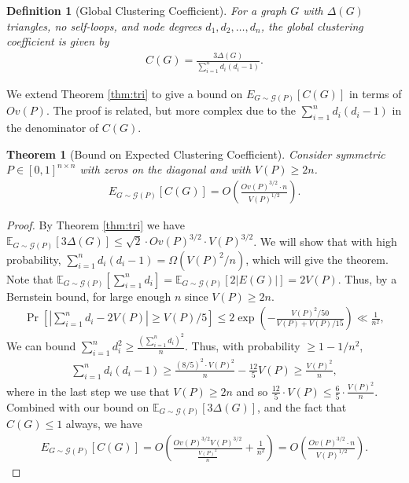 \documentclass{article}
\newtheorem{theorem}{Theorem}
\newtheorem{definition}{Definition}
\newcommand{\E}{\mathbb{E}}
\begin{document}
\begin{definition}[Global Clustering Coefficient]\label{def:cc}
For a graph $G$ with $\Delta(G)$ triangles, no self-loops, and node degrees $d_1,d_2,\ldots, d_n$, the global clustering coefficient is given by
\begin{align*}
C(G) = \frac{3 \Delta(G)}{\sum_{i=1}^n d_i(d_i-1)}.
\end{align*}
\end{definition}
%
%
We extend Theorem \ref{thm:tri} to give a bound on $E_{G \sim \mathcal{G}(P)} \left [C(G) \right ]$ in terms of $Ov(P)$. The proof is related, but  more complex due to the $\sum_{i=1}^n d_i(d_i-1)$ in the denominator of $C(G)$.
\begin{theorem}[Bound on Expected Clustering Coefficient]\label{thm:cc}
Consider symmetric $P \in [0,1]^{n \times n}$ with zeros on the diagonal and with $V(P) \ge 2 n$. %
\begin{align*}
E_{G \sim \mathcal{G}(P)} \left [C(G) \right ] = O \left (\frac{Ov(P)^{3/2} \cdot n}{V(P)^{1/2}} \right ).
\end{align*}
\end{theorem}
%
\begin{proof}
By Theorem \ref{thm:tri} we have $\E_{G \sim \mathcal{G}(P)} \left [3 \Delta(G) \right ]\le \sqrt{2} \cdot  Ov(P)^{3/2} \cdot V(P)^{3/2}$. We will show that with high probability, $\sum_{i=1}^n d_i (d_i - 1) = \Omega (V(P)^2/n)$, which will give the theorem.
Note that $\E_{G \sim \mathcal{G}(P)} \left [\sum_{i =1}^n d_i \right ] = \E_{G \sim \mathcal{G}(P)}[2|E(G)|] = 2 V(P)$. Thus,
by a Bernstein bound, for large enough $n$ since $V(P) \ge 2n$.
\begin{align*}
\Pr \left [ \left |\sum_{i =1}^n d_i - 2V(P) \right | \ge V(P)/5 \right ] \le 2 \exp\left (- \frac{V(P)^2/50}{V(P)+V(P)/15} \right ) \ll \frac{1}{n^2},
\end{align*}
We can bound 
%
%
%
 $\sum_{i=1}^{n} d_i^2 \ge \frac{\left (\sum_{i=1}^n d_i\right)^2}{n}$. Thus, with probability $\ge 1-1/n^2$,
\begin{align*}
\sum_{i=1}^n d_i(d_i - 1) \ge \frac{(8/5)^2 \cdot V(P)^2}{n} - \frac{12}{5} V(P) \ge \frac{V(P)^2}{n},
\end{align*}
where in the last step we use that $V(P) \ge 2n$ and so $\frac{12}{5} \cdot V(P) \le \frac{6}{5} \cdot \frac{V(P)^2}{n}$. Combined with our bound on $\E_{G \sim \mathcal{G}(P)} \left [3 \Delta(G) \right ]$, and the fact that $C(G) \le 1$ always, we have
\begin{align*}
E_{G \sim \mathcal{G}(P)} \left [C(G) \right ] = O \left ( \frac{ Ov(P)^{3/2} V(P)^{3/2}}{\frac{V(P)^2}{n}} + \frac{1}{n^2} \right ) = O \left (\frac{Ov(P)^{3/2} \cdot n}{V(P)^{1/2}} \right ).
\end{align*}
\end{proof}
\end{document}
